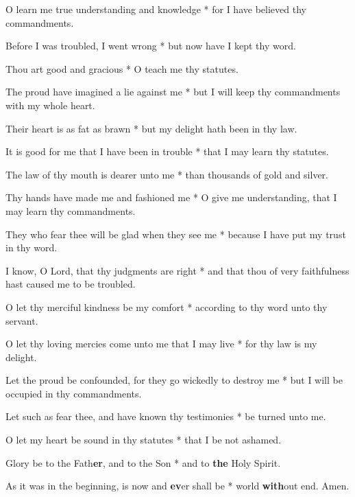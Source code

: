 \begin{multicols}{2}
	O learn me true understanding and knowledge * for I have believed thy commandments.
	
	Before I was troubled, I went wrong * but now have I kept thy word.
	
	Thou art good and gracious * O teach me thy statutes.
	
	The proud have imagined a lie against me * but I will keep thy commandments with my whole heart.
	
	Their heart is as fat as brawn * but my delight hath been in thy law.
	
	It is good for me that I have been in trouble * that I may learn thy statutes.
	
	The law of thy mouth is dearer unto me * than thousands of gold and silver.
	
	Thy hands have made me and fashioned me * O give me understanding, that I may learn thy commandments.
	
	They who fear thee will be glad when they see me * because I have put my trust in thy word.
	
	I know, O Lord, that thy judgments are right * and that thou of very faithfulness hast caused me to be troubled.
	
	O let thy merciful kindness be my comfort * according to thy word unto thy servant.
	
	O let thy loving mercies come unto me that I may live * for thy law is my delight.
	
	Let the proud be confounded, for they go wickedly to destroy me * but I will be occupied in thy commandments.
	
	Let such as fear thee, and have known thy testimonies * be turned unto me.
	
	O let my heart be sound in thy statutes * that I be not ashamed.
	
	Glory be to the Fath\textbf{er}, and to the Son * and to \textbf{the} Holy Spirit.
	
	As it was in the beginning, is now and \textbf{ev}er shall be * world \textbf{with}out end. Amen.
\end{multicols}